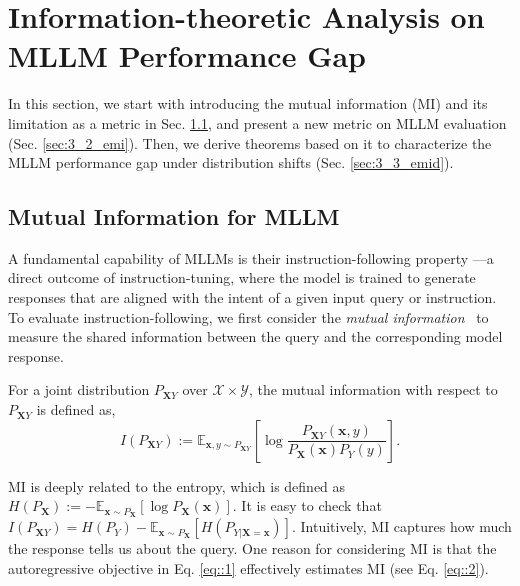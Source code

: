 \section{Information-theoretic Analysis on MLLM Performance Gap} \label{sec:theoretical_analysis}
In this section, we start with introducing the mutual information (MI) and its limitation as a metric in Sec. \ref{sec:3_0_mi_for_eval}, and present a new metric on MLLM evaluation (Sec. \ref{sec:3_2_emi}). Then, we derive theorems based on it to characterize the MLLM performance gap under distribution shifts (Sec. \ref{sec:3_3_emid}).

\subsection{Mutual Information for MLLM } \label{sec:3_0_mi_for_eval}


A fundamental capability of MLLMs is their instruction-following property \cite{ouyang2022training}---a direct outcome of instruction-tuning, where the model is trained to generate responses that are aligned with the intent of a given input query or instruction. To evaluate instruction-following, we first consider the \textit{mutual information}~\cite{shannon1948mathematical} to measure the shared information between the query and the corresponding model response. 
%
\begin{definition} For a joint distribution $P_{\mathbf{X}Y}$ over $\mathcal{X}\times \mathcal{Y}$, the mutual information with respect to $P_{\mathbf{X}Y}$ is defined as,
\begin{equation} \label{eq:mi}
    I(P_{\mathbf{X}Y}) := \mathbb{E}_{\mathbf{x},y\sim P_{\mathbf{X}Y}}[\log \frac{P_{\mathbf{X}Y}(\mathbf{x},y)}{P_{\mathbf{X}}(\mathbf{x})P_Y(y)}].
\end{equation}\label{def:mi}
\end{definition}
\vspace{-0.5em}
MI is deeply related to the entropy, which is defined as $H(P_{\mathbf{X}}) :=  - \mathbb{E}_{\mathbf{x}\sim P_\mathbf{X}} [\log P_{\mathbf{X}}(\mathbf{x})]$.
It is easy to check that $I(P_{\mathbf{X}Y})=H(P_{Y} )-\mathbb{E}_{\mathbf{x}\sim P_{\mathbf{X}}} [H(P_{Y|\mathbf{X}=\mathbf{x}})]$. Intuitively, MI captures how much the response tells us about the query. One reason for considering MI is that the autoregressive objective in Eq. \eqref{eq::1} effectively estimates MI (see Eq. \eqref{eq::2}).

